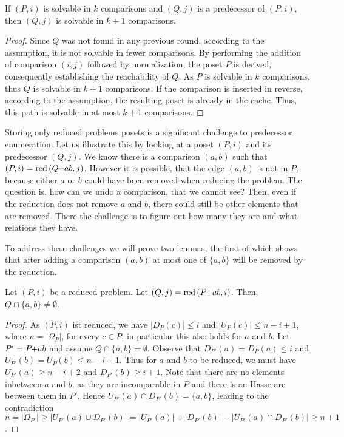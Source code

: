 \documentclass[twoside,leqno,twocolumn]{article}
\newcommand{\pchild}[3]{{#1}\kern-1pt{+}{#2}{#3}}
\newcommand{\reduced}[1]{\operatorname{red}{#1}}
\newcommand{\less}[2]{D_{#1}(#2)}
\newcommand{\greater}[2]{U_{#1}(#2)}
\begin{document}
\begin{lemma} \label{lemma:predecessor_calculation}
  If $(P, i)$ is solvable in $k$ comparisons and $(Q, j)$ is a predecessor of $(P, i)$, then $(Q, j)$ is solvable in $k + 1$ comparisons.
\end{lemma}

\begin{proof} \label{proof:predecessor_calculation} %
  Since $Q$ was not found in any previous round, according to the assumption, it is not solvable in fewer comparisons. %
  By performing the addition of comparison $(i, j)$ followed by normalization, the poset $P$ is derived, consequently establishing the reachability of $Q$.
  As $P$ is solvable in $k$ comparisons, thus $Q$ is solvable in $k + 1$ comparisons.
  If the comparison is inserted in reverse, according to the assumption, the resulting poset is already in the cache.
  Thus, this path is solvable in at most $k + 1$ comparisons.
\end{proof}

Storing only reduced problems posets is a significant challenge to predecessor enumeration.
Let us illustrate this by looking at a poset $(P, i)$ and its predecessor $(Q, j)$.
We know there is a comparison $(a, b)$ such that $(P, i) = \reduced(\pchild{Q}{a}{b}, j)$.
However it is possible, that the edge $(a, b)$ is not in $P$, because either $a$ or $b$ could have been removed when reducing the problem.
The question is, how can we undo a comparison, that we cannot see?
Then, even if the reduction does not remove $a$ and $b$, there could still be other elements that are removed.
There the challenge is to figure out how many they are and what relations they have.

To address these challenges we will prove two lemmas, the first of which shows that after adding a comparison $(a, b)$ at most one of $\{a, b\}$ will be removed by the reduction.

\begin{lemma} \label{lemma:remove_only_last_element_edge}
  Let $(P, i)$ be a reduced problem.
  Let $(Q, j) = \reduced{(\pchild{P}{a}{b}, i)}$.
  Then, $Q \cap \{a ,b \} \neq \emptyset$.
\end{lemma}

\begin{proof}
  As $(P, i)$ ist reduced, we have $|\less{P}{c}| \le i$ and $|\greater{P}{c}| \le n - i + 1$, where $n = |\Omega_P|$, for every $c \in P$, in particular this also holds for $a$ and $b$.
  Let $P' = \pchild{P}{a}{b}$ and assume $Q \cap \{a ,b \} = \emptyset$.
  Observe that $\less{P'}{a} = \less{P}{a} \le i$ and $\greater{P'}{b} = \greater{P}{b} \le n - i + 1$.
  Thus for $a$ and $b$ to be reduced, we must have $\greater{P'}{a} \ge n - i + 2$ and $\less{P'}{b} \ge i + 1$.
  Note that there are no elements inbetween $a$ and $b$, as they are incomparable in $P$ and there is an Hasse arc between them in $P'$.
  Hence $\greater{P'}{a} \cap \less{P'}{b} = \{a, b\}$, leading to the contradiction $n = |\Omega_{P'}| \ge |\greater{P'}{a} \cup \less{P'}{b}| = |\greater{P'}{a}| + |\less{P'}{b}| - |\greater{P'}{a} \cap \less{P'}{b}| \ge n + 1$.
\end{proof}
\end{document}

